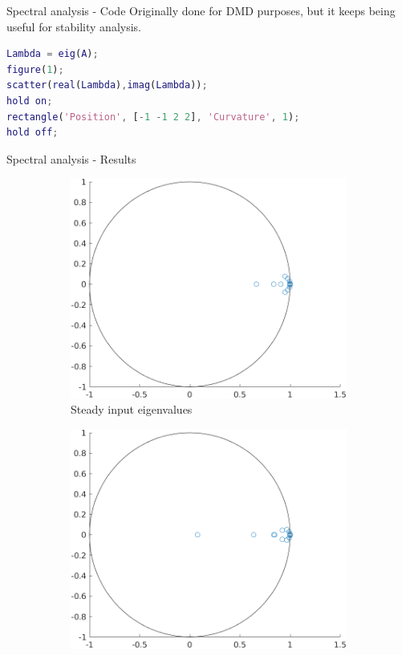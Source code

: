 \documentclass{beamer}
\begin{document}
\begin{frame}[fragile]{Spectral analysis - Code}
    Originally done for DMD purposes, but it keeps being useful for stability analysis.

    \begin{lstlisting}[language=Matlab]
Lambda = eig(A);
figure(1);
scatter(real(Lambda),imag(Lambda));
hold on;
rectangle('Position', [-1 -1 2 2], 'Curvature', 1);
hold off;
    \end{lstlisting}
\end{frame}

\begin{frame}{Spectral analysis - Results}
    \begin{figure}
        \centering
        \begin{subfigure}[b]{0.45\textwidth}
            \centering
            \includegraphics[width=\textwidth]{Steady_Eigen.png}
            \caption{Steady input eigenvalues}
            \label{fig:steady_eigen}
        \end{subfigure}
        \hfill
        \begin{subfigure}[b]{0.45\textwidth}
            \centering
            \includegraphics[width=\textwidth]{Unsteady_Eigen.png}

\end{subfigure}
\end{figure}
\end{frame}
\end{document}
